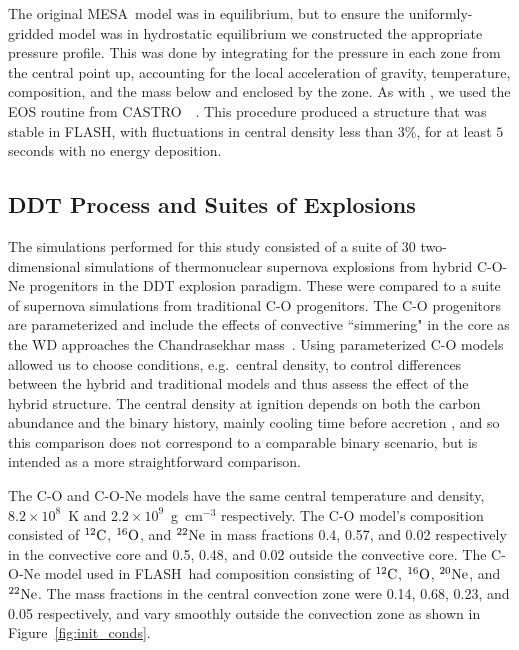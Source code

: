 \documentclass[preprint2]{aastex63}
\newcommand{\C}[1]{\ensuremath{{}^{#1}{\rm C}}}
\newcommand{\Ox}[1]{\ensuremath{{}^{#1}{\rm O}}}
\newcommand{\Ne}[1]{\ensuremath{{}^{#1}{\rm Ne}}}
\newcommand{\code}[1]{\textsc{#1}}
\newcommand{\FLASH}{\code{FLASH}}
\newcommand{\CASTRO}{\code{CASTRO}}
\newcommand{\MESA}{\code{MESA}}
\begin{document}
The original \MESA\ model was in equilibrium, but to ensure
the uniformly-gridded model was in hydrostatic equilibrium we
constructed the appropriate pressure profile. This was done by
integrating for the pressure in each zone from the central point up,
accounting for the local acceleration of gravity, temperature,
composition, and the mass below and enclosed by the zone. As
with \citet{willcoxetal2016}, we used the EOS routine from
\CASTRO\ ~\citep{timmes.swesty:accuracy,castro1}.
This procedure produced a structure that was stable in \FLASH, with 
fluctuations in central density less than $3\%$, for at least $5$ 
seconds with no energy deposition.

\subsection{DDT Process and Suites of Explosions}

The simulations performed for this study consisted of a suite of
30 two-dimensional simulations of thermonuclear supernova explosions 
from hybrid C-O-Ne progenitors in the DDT explosion paradigm. These
were compared to a suite of supernova simulations from traditional C-O 
progenitors. {\color{blue} The C-O progenitors are parameterized and 
include the effects of convective ``simmering" in the core as the WD 
approaches the Chandrasekhar mass~\citep{Chametal08,PiroBild08,jacketal2010}.
Using parameterized C-O models allowed us to choose conditions, e.g.\
central density, to control differences between the hybrid and traditional 
models and thus assess the effect of the hybrid structure.}
{\color{green}
The central density at ignition depends on both the carbon abundance 
and the binary history, mainly cooling time before accretion 
\citep{Kruegeretal2012}, and so this comparison does not correspond 
to a comparable binary scenario, but is intended as a more 
straightforward comparison.
}

The C-O and C-O-Ne models have the same central temperature
and density, $8.2\times 10^8$~K and $2.2\times 10^9$~g~cm$^{-3}$ respectively.
The C-O model's composition consisted of \C{12}, \Ox{16}, and \Ne{22} in mass fractions 0.4, 0.57, and 0.02 respectively in the convective core and 0.5, 0.48, and 0.02 outside the convective core.
The C-O-Ne model used in \FLASH\ had composition consisting of \C{12}, \Ox{16}, \Ne{20}, and \Ne{22}.
The mass fractions in the central convection zone were 0.14, 0.68, 0.23, and 0.05 respectively, and vary smoothly outside the convection zone as shown in Figure~\ref{fig:init_conds}.
\end{document}
